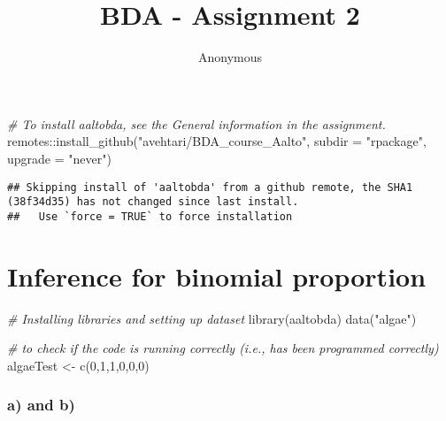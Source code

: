 \documentclass[
]{article}
\title{BDA - Assignment 2}
\author{Anonymous}
\date{}
\newenvironment{Shaded}{\begin{snugshade}}{\end{snugshade}}
\newcommand{\AttributeTok}[1]{\textcolor[rgb]{0.77,0.63,0.00}{#1}}
\newcommand{\CommentTok}[1]{\textcolor[rgb]{0.56,0.35,0.01}{\textit{#1}}}
\newcommand{\DecValTok}[1]{\textcolor[rgb]{0.00,0.00,0.81}{#1}}
\newcommand{\FunctionTok}[1]{\textcolor[rgb]{0.00,0.00,0.00}{#1}}
\newcommand{\NormalTok}[1]{#1}
\newcommand{\OtherTok}[1]{\textcolor[rgb]{0.56,0.35,0.01}{#1}}
\newcommand{\SpecialCharTok}[1]{\textcolor[rgb]{0.00,0.00,0.00}{#1}}
\newcommand{\StringTok}[1]{\textcolor[rgb]{0.31,0.60,0.02}{#1}}
\begin{document}
\maketitle

{
\hypersetup{linkcolor=}
\setcounter{tocdepth}{1}
\tableofcontents
}
\begin{Shaded}
\begin{Highlighting}[]
\CommentTok{\# To install aaltobda, see the General information in the assignment.}
\NormalTok{remotes}\SpecialCharTok{::}\FunctionTok{install\_github}\NormalTok{(}\StringTok{"avehtari/BDA\_course\_Aalto"}\NormalTok{, }\AttributeTok{subdir =} \StringTok{"rpackage"}\NormalTok{, }\AttributeTok{upgrade =} \StringTok{"never"}\NormalTok{)}
\end{Highlighting}
\end{Shaded}

\begin{verbatim}
## Skipping install of 'aaltobda' from a github remote, the SHA1 (38f34d35) has not changed since last install.
##   Use `force = TRUE` to force installation
\end{verbatim}

\hypertarget{inference-for-binomial-proportion}{%
\section{Inference for binomial
proportion}\label{inference-for-binomial-proportion}}

\begin{Shaded}
\begin{Highlighting}[]
\CommentTok{\# Installing libraries and setting up dataset}
\FunctionTok{library}\NormalTok{(aaltobda)}
\FunctionTok{data}\NormalTok{(}\StringTok{"algae"}\NormalTok{)}
\end{Highlighting}
\end{Shaded}

\begin{Shaded}
\begin{Highlighting}[]
\CommentTok{\# to check if the code is running correctly (i.e., has been programmed correctly)}
\NormalTok{algaeTest }\OtherTok{\textless{}{-}} \FunctionTok{c}\NormalTok{(}\DecValTok{0}\NormalTok{,}\DecValTok{1}\NormalTok{,}\DecValTok{1}\NormalTok{,}\DecValTok{0}\NormalTok{,}\DecValTok{0}\NormalTok{,}\DecValTok{0}\NormalTok{)}
\end{Highlighting}
\end{Shaded}

\hypertarget{a-and-b}{%
\subsubsection{a) and b)}\label{a-and-b}}
\end{document}
